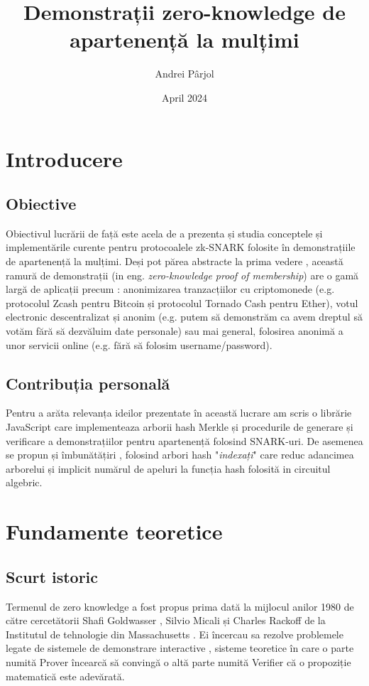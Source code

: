 \documentclass[12pt, letterpaper]{article}
\title{Demonstrații zero-knowledge de apartenență la mulțimi}
\author{Andrei Pârjol}
\date{April 2024}
\begin{document}
\maketitle

\section{Introducere}

\subsection{Obiective} Obiectivul lucrării de față este acela de a prezenta și studia conceptele și implementările curente pentru protocoalele zk-SNARK folosite în demonstrațiile de apartenență la mulțimi. Deși pot părea abstracte la prima vedere , această ramură de demonstrații (in eng. \emph{zero-knowledge proof of membership}) are o gamă largă de aplicații precum : anonimizarea tranzacțiilor cu criptomonede (e.g. protocolul Zcash pentru Bitcoin și protocolul Tornado Cash pentru Ether), votul electronic descentralizat și anonim (e.g. putem să demonstrăm ca avem dreptul să votăm fără să dezvăluim date personale) sau mai general, folosirea anonimă a unor servicii online (e.g. fără să folosim username/password).

\subsection{Contribuția personală}

Pentru a arăta relevanța ideilor prezentate în această lucrare am scris o librărie JavaScript care implementeaza arborii hash Merkle și procedurile de generare și verificare a demonstrațiilor pentru apartenență folosind SNARK-uri. De asemenea se propun și îmbunătățiri , folosind arbori hash "\emph{indexați}" care reduc adancimea arborelui și implicit numărul de apeluri la funcția hash folosită in circuitul algebric.

\pagebreak

\section{Fundamente teoretice}
\subsection{Scurt istoric}
\vspace{5mm}
    Termenul de zero knowledge a fost propus prima dată la mijlocul anilor 1980 de către cercetătorii  Shafi Goldwasser , Silvio Micali și Charles Rackoff de la Institutul de tehnologie din Massachusetts . Ei încercau sa rezolve problemele legate de sistemele de demonstrare interactive , sisteme teoretice în care o parte numită Prover încearcă să convingă o altă parte numită Verifier că o propoziție matematică este adevărată.
\end{document}
